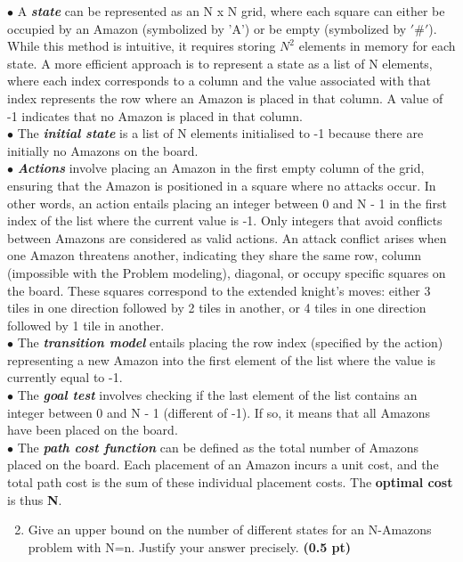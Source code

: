 \documentclass[11pt,a4paper]{report}
\begin{document}
\begin{answers}[8cm]
\small{$\bullet$ A \textbf{\textit{state}} can be represented as an N x N grid, where each square can either be occupied by an Amazon (symbolized by 'A') or be empty (symbolized by $'\#'$). While this method is intuitive, it requires storing $N^2$ elements in memory for each state. A more efficient approach is to represent a state as a list of N elements, where each index corresponds to a column and the value associated with that index represents the row where an Amazon is placed in that column. A value of -1 indicates that no Amazon is placed in that column. \\
$\bullet$ The \textbf{\textit{initial state}} is a list of N elements initialised to -1 because there are initially no Amazons on the board. \\
$\bullet$ \textbf{\textit{Actions}} involve placing an Amazon in the first empty column of the grid, ensuring that the Amazon is positioned in a square where no attacks occur. In other words, an action entails placing an integer between 0 and N - 1 in the first index of the list where the current value is -1. Only integers that avoid conflicts between Amazons are considered as valid actions. An attack conflict arises when one Amazon threatens another, indicating they share the same row, column (impossible with the Problem modeling), diagonal, or occupy specific squares on the board. These squares correspond to the extended knight's moves: either 3 tiles in one direction followed by 2 tiles in another, or 4 tiles in one direction followed by 1 tile in another. \\
$\bullet$ The \textbf{\textit{transition model}} entails placing the row index (specified by the action) representing a new Amazon into the first element of the list where the value is currently equal to -1. \\
$\bullet$ The \textbf{\textit{goal test}} involves checking if the last element of the list contains an integer between 0 and N - 1 (different of -1). If so, it means that all Amazons have been placed on the board. \\
$\bullet$ The \textbf{\textit{path cost function}} can be defined as the total number of Amazons placed on the board. Each placement of an Amazon incurs a unit cost, and the total path cost is the sum of these individual placement costs. The \textbf{optimal cost} is thus \textbf{N}.}
\end{answers}


\newpage
\begin{enumerate}
\setcounter{enumi}{1}
\item Give an upper bound on the number of different states for an N-Amazons problem with N=n. Justify your answer precisely. \textbf{(0.5 pt)}
\end{enumerate}
\end{document}
